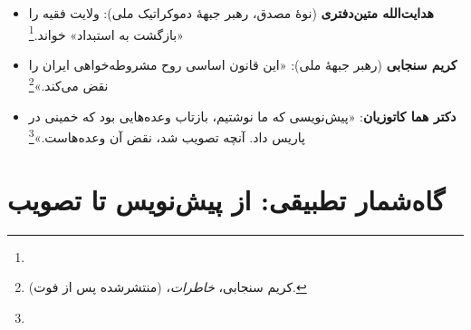 \begin{itemize}[label=\textcolor{cAccent}{$\blacktriangleright$}, rightmargin=2em]
    \item \textbf{هدایت‌الله متین‌دفتری} (نوهٔ مصدق، رهبر جبههٔ دموکراتیک ملی): ولایت فقیه را «بازگشت به استبداد» خواند.\footnote{}
    \item \textbf{کریم سنجابی} (رهبر جبههٔ ملی): «این قانون اساسی روح مشروطه‌خواهی ایران را نقض می‌کند.»\footnote{کریم سنجابی، \textit{خاطرات}، (منتشرشده پس از فوت).}
    \item \textbf{دکتر هما کاتوزیان}: «پیش‌نویسی که ما نوشتیم، بازتاب وعده‌هایی بود که خمینی در پاریس داد. آنچه تصویب شد، نقض آن وعده‌هاست.»\footnote{}
\end{itemize}

\section{گاه‌شمار تطبیقی: از پیش‌نویس تا تصویب}

